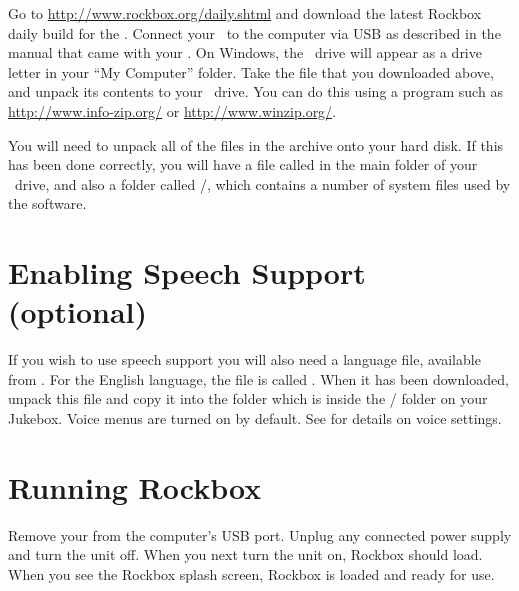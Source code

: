 	Go to \url{http://www.rockbox.org/daily.shtml} and download the latest 
	Rockbox daily build for the \playername{}.  Connect your \playername\ to the 
	computer via USB as described in the manual that came with your \playername{}. 
	On Windows, the	\playername\ drive will appear as a drive letter in your 
	``My Computer''	folder. Take the file that you downloaded above, and unpack 
	its contents to	your \playername\ drive. You can do this using a program 
	such as \url{http://www.info-zip.org/} or \url{http://www.winzip.org/}.


	You will need to unpack all of the files in the archive onto your hard disk. 
	If this has been done correctly, you will have a file called 
	\fname{\firmwarefilename} in the main folder of your \playername\ drive, and 
	also a folder called /, which contains a number of system 
	files used by the software. 
	

\section{Enabling Speech Support (optional)}\label{sec:enabling_speech_support} 
If you wish to use speech support you will also need a language file, available 
from .  For the English language, the file is called 
. When it has been downloaded, unpack this file and copy it 
into the  folder which is inside the / folder on 
your Jukebox. Voice menus are turned on by default. See 
 for details on voice settings.

\section{Running Rockbox} 
Remove your \dap from the computer's USB port. Unplug any connected power supply 
and turn the unit off. When you next turn the unit on, Rockbox should load. When 
you see the Rockbox splash screen, Rockbox is loaded and ready for use.


